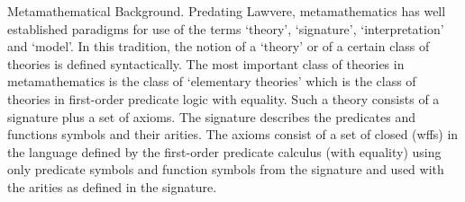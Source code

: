 
\note  Metamathematical Background. Predating Lawvere, metamathematics has well established paradigms for use of the terms
`theory', `signature', `interpretation' and  `model'.
In this tradition, the notion of a `theory' or of a certain class of theories is  defined syntactically.
The most important class of theories in  metamathematics is the class of `elementary theories' 
which is the class of theories in first-order predicate logic with equality. Such a theory consists of a signature plus a set of axioms. 
The signature describes the predicates and functions symbols and their arities. 
The axioms consist of a set of closed  (wffs) in the language defined by the first-order predicate calculus (with equality)
 using only predicate symbols and function symbols from the signature and used with the arities as defined in the signature. 

